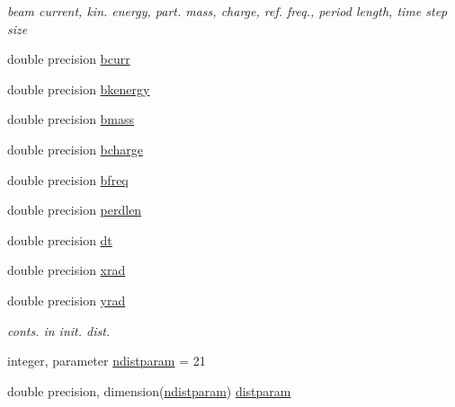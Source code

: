 \textbf{ }\par
{\em beam current, kin. energy, part. mass, charge, ref. freq., period length, time step size }\begin{DoxyCompactItemize}
\item 
double precision \mbox{\hyperlink{namespaceaccsimulatorclass_a6fc5d39764a136b9e0748e3f7f130a45}{bcurr}}
\item 
double precision \mbox{\hyperlink{namespaceaccsimulatorclass_a7ef66bd559d23461f9309d1b6b68af7d}{bkenergy}}
\item 
double precision \mbox{\hyperlink{namespaceaccsimulatorclass_a01b613622328ba96dda4713ebd322485}{bmass}}
\item 
double precision \mbox{\hyperlink{namespaceaccsimulatorclass_a010a96d950e24cf02277e621d90da69d}{bcharge}}
\item 
double precision \mbox{\hyperlink{namespaceaccsimulatorclass_acc764ececa5e033fc6e23a807dec286c}{bfreq}}
\item 
double precision \mbox{\hyperlink{namespaceaccsimulatorclass_a6b0f4b414cc1d61ea6ff0b558a116404}{perdlen}}
\item 
double precision \mbox{\hyperlink{namespaceaccsimulatorclass_a75bc9f035300456d55f46abe5272e8c2}{dt}}
\item 
double precision \mbox{\hyperlink{namespaceaccsimulatorclass_a0ac072649cfeb3a33d639154d38dea2b}{xrad}}
\item 
double precision \mbox{\hyperlink{namespaceaccsimulatorclass_a9dbe475946e3dcfce115620500c6a0b4}{yrad}}
\end{DoxyCompactItemize}

\textbf{ }\par
{\em conts. in init. dist. }\begin{DoxyCompactItemize}
\item 
integer, parameter \mbox{\hyperlink{namespaceaccsimulatorclass_a47c42ba384198193c23d4149fea01e14}{ndistparam}} = 21
\item 
double precision, dimension(\mbox{\hyperlink{namespaceaccsimulatorclass_a47c42ba384198193c23d4149fea01e14}{ndistparam}}) \mbox{\hyperlink{namespaceaccsimulatorclass_a93766a3c8ca80b873798adda649aec53}{distparam}}
\end{DoxyCompactItemize}

